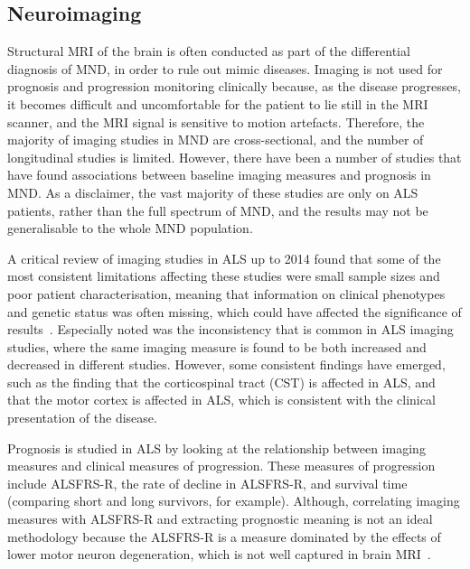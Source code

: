 \subsection{Neuroimaging}

Structural MRI of the brain is often conducted as part of the differential diagnosis of MND, in order to rule out mimic diseases.
Imaging is not used for prognosis and progression monitoring clinically because, as the disease progresses, it becomes difficult and uncomfortable for the patient to lie still in the MRI scanner, and the MRI signal is sensitive to motion artefacts.
Therefore, the majority of imaging studies in MND are cross-sectional, and the number of longitudinal studies is limited.
However, there have been a number of studies that have found associations between baseline imaging measures and prognosis in MND.
As a disclaimer, the vast majority of these studies are only on ALS patients, rather than the full spectrum of MND, and the results may not be generalisable to the whole MND population.

A critical review of imaging studies in ALS up to 2014 found that some of the most consistent limitations affecting these studies were small sample sizes and poor patient characterisation, meaning that information on clinical phenotypes and genetic status was often missing, which could have affected the significance of results~\cite{bedeLessonsALSImaging2014}.
Especially noted was the inconsistency that is common in ALS imaging studies, where the same imaging measure is found to be both increased and decreased in different studies.
However, some consistent findings have emerged, such as the finding that the corticospinal tract (CST) is affected in ALS, and that the motor cortex is affected in ALS, which is consistent with the clinical presentation of the disease.

Prognosis is studied in ALS by looking at the relationship between imaging measures and clinical measures of progression.
These measures of progression include ALSFRS-R, the rate of decline in ALSFRS-R, and survival time (comparing short and long survivors, for example).
Although, correlating imaging measures with ALSFRS-R and extracting prognostic meaning is not an ideal methodology because the ALSFRS-R is a measure dominated by the effects of lower motor neuron degeneration, which is not well captured in brain MRI~\cite{bedeLessonsALSImaging2014}.

